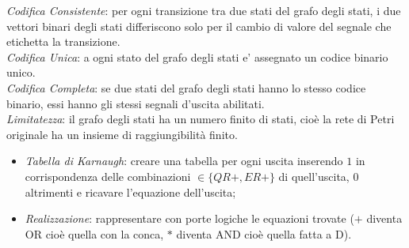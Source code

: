\documentclass[a4paper, notitlepage, 10pt]{report}
\begin{document}
\begin{multicols}{2}
	\noindent
	\textit{Codifica Consistente}: per ogni transizione tra due stati del grafo degli stati, i due vettori binari degli stati differiscono solo per il cambio di valore del segnale che etichetta la transizione.\\
	\textit{Codifica Unica}: a ogni stato del grafo degli stati e’ assegnato un codice binario unico.\\
	\textit{Codifica Completa}: se due stati del grafo degli stati hanno lo stesso codice binario, essi hanno gli stessi segnali d’uscita abilitati.\\
	\textit{Limitatezza}: il grafo degli stati ha un numero finito di stati, cioè la rete di Petri originale ha un insieme di raggiungibilità finito.
	
	\begin{itemize}
	\item \textit{Tabella di Karnaugh}: creare una tabella per ogni uscita inserendo $1$ in corrispondenza delle combinazioni $\in \{QR+, ER+\}$ di quell'uscita, $0$ altrimenti e ricavare l'equazione dell'uscita;
		\item \textit{Realizzazione}: rappresentare con porte logiche le equazioni trovate ($+$ diventa OR cioè quella con la conca, $*$ diventa AND cioè quella fatta a D).
	\end{itemize}
\columnbreak
	\begin{figure}[H]
		\centering

\end{figure}
\end{multicols}
\end{document}
